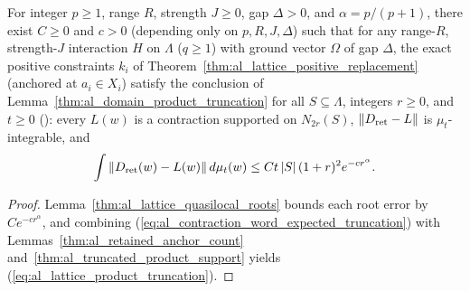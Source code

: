 \begin{lemma}
    \label{thm:al_lattice_product_truncation}
    \leanok
    For integer $p\ge1$, range $R$, strength $J\ge0$, gap $\Delta>0$, and
    $\alpha=p/(p+1)$, there exist $C\ge0$ and $c>0$ (depending only on
    $p,R,J,\Delta$) such that for any range-$R$, strength-$J$ interaction
    $H$ on $\Lambda$ ($q\ge1$) with ground vector $\Omega$ of gap $\Delta$,
    the exact positive constraints $k_i$ of
    Theorem~\ref{thm:al_lattice_positive_replacement} (anchored at
    $a_i\in X_i$) satisfy the conclusion of
    Lemma~\ref{thm:al_domain_product_truncation} for all
    $S\subseteq\Lambda$, integers $r\ge0$, and $t\ge0$
    (\cite[Lemma~10.1]{OpenAI2026AreaLaw}): every $L(w)$ is a contraction
    supported on $N_{2r}(S)$, $\|D_{\rm ret}-L\|$ is $\mu_t$-integrable,
    and
    \begin{align}
        \int\|D_{\rm ret}(w)-L(w)\|\,d\mu_t(w)
        \le Ct\,|S|\,(1+r)^2e^{-cr^\alpha}.
        \label{eq:al_lattice_product_truncation}
    \end{align}
\end{lemma}
\begin{proof}\leanok
    Lemma~\ref{thm:al_lattice_quasilocal_roots} bounds each root error
    by $Ce^{-cr^\alpha}$, and combining
    (\ref{eq:al_contraction_word_expected_truncation}) with
    Lemmas~\ref{thm:al_retained_anchor_count}
    and~\ref{thm:al_truncated_product_support} yields
    (\ref{eq:al_lattice_product_truncation}).
\end{proof}
